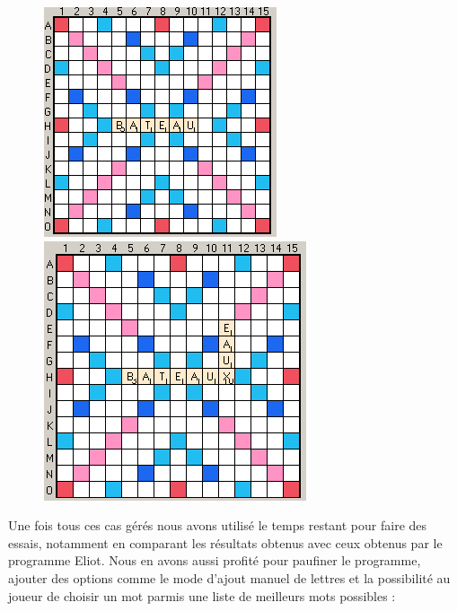 \documentclass[a4paper,8pt,french,fleqn]{article}
\begin{document}
\begin{figure}[h]
  \begin{center}
    \vspace{0.2cm}
    \includegraphics[scale=0.5]{cas4a.png}
    \hspace{1.5cm}
    \includegraphics[scale=0.45]{cas4b.png}
  \end{center}
\end{figure}

Une fois tous ces cas gérés nous avons utilisé le temps restant pour faire des essais, notamment en comparant les résultats obtenus avec ceux obtenus par le programme Eliot. Nous en avons aussi profité pour paufiner le programme, ajouter des options comme le mode d'ajout manuel de lettres et la possibilité au joueur de choisir un mot parmis une liste de meilleurs mots possibles :
\end{document}
